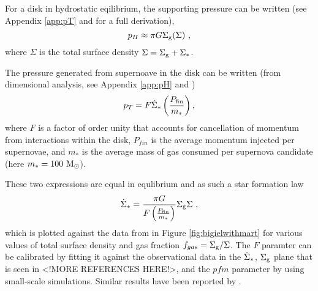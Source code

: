For a disk in hydrostatic eqilibrium, the supporting pressure can be written (see Appendix \ref{app:pT} and \citet{ostriker_maximally_2011} for a full derivation),
\begin{equation}
\label{eqn:hydeq}
p_H \approx \pi G \Sigma_\mathrm{g} (\Sigma)~,
\end{equation}
where $\Sigma$ is the total surface density $\Sigma = \Sigma_\mathrm{g} + \Sigma_*$.

The pressure generated from supernoave in the disk can be written (from dimensional analysis, see Appendix \ref{app:pH} and \citet{martizzi_supernova_2015})
\begin{equation}
\label{eqn:turb}
p_T = F \dot{\Sigma}_* \left(\frac{P_\mathrm{fin}}{m_*}\right),
\end{equation}
where $F$ is a factor of order unity that accounts for cancellation of momentum from interactions within the disk, $P_{fin}$ is the average momentum injected per supernovae, and $m_*$ is the average mass of gas consumed per supernova candidate (here $m_* = 100 ~\mathrm{M}_{\odot}$).

These two expressions are equal in equlibrium and as such a star formation law
\begin{equation}
\label{eqn:martsfr}
\dot{\Sigma}_* = \frac{\pi G}{F \left(\frac{P_\mathrm{fin}}{m_*}\right)} \Sigma_\mathrm{g} \Sigma~,
\end{equation}
which is plotted against the data from \citet{bigiel_star_2008} in Figure \ref{fig:bigielwithmart} for various values of total surface density and gas fraction $f_{gas} = \Sigma_\mathrm{g}/\Sigma$.
The $F$ paramter can be calibrated by fitting it against the observational data in the $\dot{\Sigma}_*$, $\Sigma_\mathrm{g}$ plane that is seen in \citet{bigiel_star_2008} <!MORE REFERENCES HERE!>, and the $pfm$ parameter by using small-scale simulations.
Similar results have been reported by \citep{ostriker_maximally_2011}.
